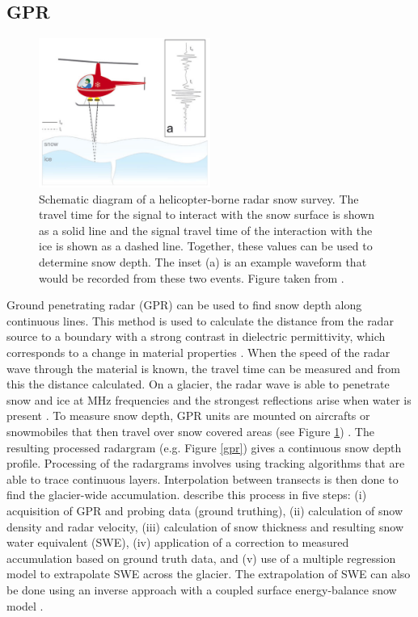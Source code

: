 \documentclass{sfuthesis}
\begin{document}
\subsection{GPR}
\label{sec:GPR}
\begin{figure}
 \centering
      \includegraphics[width=0.5\textwidth]{gpr_air.png}
  \caption{Schematic diagram of a helicopter-borne radar snow survey. The travel time for the signal to interact with the snow surface is shown as a solid line and the signal travel time of the interaction with the ice is shown as a dashed line. Together, these values can be used to determine snow depth. The inset (a) is an example waveform that would be recorded from these two events. Figure taken from \cite{Gusmeroli2014}.}
        \label{gprair}
\end{figure}

Ground penetrating radar (GPR) can be used to find snow depth along continuous lines. This method is used to calculate the distance from the radar source to a boundary with a strong contrast in dielectric permittivity, which corresponds to a change in material properties \citep{Sold2013}. When the speed of the radar wave through the material is known, the travel time can be measured and from this the distance calculated. On a glacier, the radar wave is able to penetrate snow and ice at MHz frequencies and the strongest reflections arise when water is present \citep{Sold2013}. To measure snow depth, GPR units are mounted on aircrafts or snowmobiles that then travel over snow covered areas (see Figure \ref{gprair}) \citep{Machguth2006, McGrath2015}. The resulting processed radargram (e.g. Figure \ref{gpr}) gives a continuous snow depth profile. Processing of the radargrams involves using tracking algorithms that are able to trace continuous layers. Interpolation between transects is then done to find the glacier-wide accumulation. \cite{McGrath2015} describe this process in five steps: (i) acquisition of GPR and probing data (ground truthing), (ii) calculation of snow density and radar velocity, (iii) calculation of snow thickness and resulting snow water equivalent (SWE), (iv) application of a correction to measured accumulation based on ground truth data, and (v) use of a multiple regression model to extrapolate SWE across the glacier. The extrapolation of SWE can also be done using an inverse approach with a coupled surface energy-balance snow model \citep{Pelt2014}.
\end{document}
